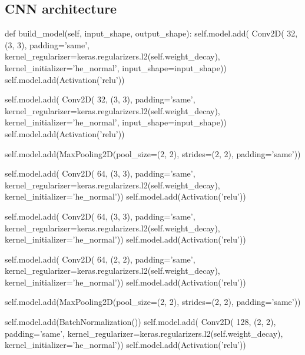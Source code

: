 \begin{appendices}
\section{CNN architecture}
\label{cnnn}
\begin{python}
def build_model(self, input_shape, output_shape):
        self.model.add(
            Conv2D(
                32,
                (3, 3),
                padding='same',
                kernel_regularizer=keras.regularizers.l2(self.weight_decay),
                kernel_initializer='he_normal',
                input_shape=input_shape))
        self.model.add(Activation('relu'))

        self.model.add(
            Conv2D(
                32,
                (3, 3),
                padding='same',
                kernel_regularizer=keras.regularizers.l2(self.weight_decay),
                kernel_initializer='he_normal',
                input_shape=input_shape))
        self.model.add(Activation('relu'))

        self.model.add(MaxPooling2D(pool_size=(2, 2),
                                    strides=(2, 2),
                                    padding='same'))

        self.model.add(
            Conv2D(
                64,
                (3, 3),
                padding='same',
                kernel_regularizer=keras.regularizers.l2(self.weight_decay),
                kernel_initializer='he_normal'))
        self.model.add(Activation('relu'))

        self.model.add(
            Conv2D(
                64,
                (3, 3),
                padding='same',
                kernel_regularizer=keras.regularizers.l2(self.weight_decay),
                kernel_initializer='he_normal'))
        self.model.add(Activation('relu'))

        self.model.add(
            Conv2D(
                64,
                (2, 2),
                padding='same',
                kernel_regularizer=keras.regularizers.l2(self.weight_decay),
                kernel_initializer='he_normal'))
        self.model.add(Activation('relu'))

        self.model.add(MaxPooling2D(pool_size=(2, 2),
                                    strides=(2, 2),
                                    padding='same'))

        self.model.add(BatchNormalization())
        self.model.add(
            Conv2D(
                128,
                (2, 2),
                padding='same',
                kernel_regularizer=keras.regularizers.l2(self.weight_decay),
                kernel_initializer='he_normal'))
        self.model.add(Activation('relu'))


\end{python}
\end{appendices}
